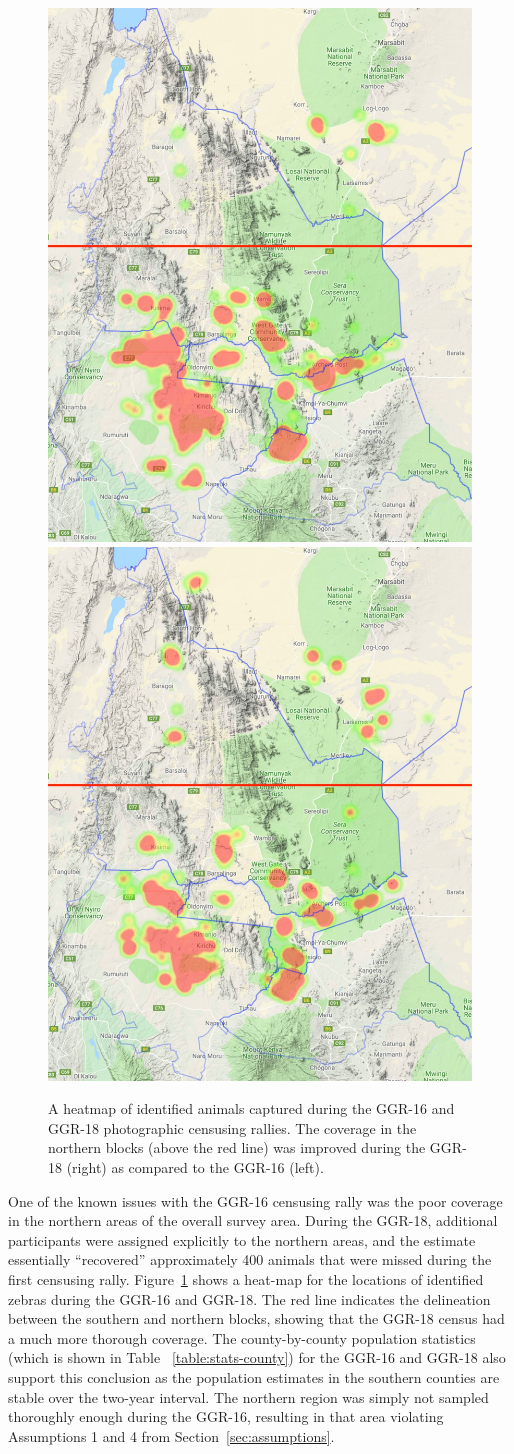 \begin{figure}[!t]
    \begin{center}
        \includegraphics[width=0.45\linewidth]{resources/coverage-ggr2016-sightings-zebra.pdf}
        \includegraphics[width=0.45\linewidth]{resources/coverage-ggr2018-sightings-zebra.pdf}
    \end{center}
    \caption{A heatmap of identified animals captured during the GGR-16 and GGR-18 photographic censusing rallies.  The coverage in the northern blocks (above the red line) was improved during the GGR-18 (right) as compared to the GGR-16 (left).}
    \label{fig:maps-coverage}
\end{figure}

One of the known issues with the GGR-16 censusing rally was the poor coverage in the northern areas of the overall survey area.  During the GGR-18, additional participants were assigned explicitly to the northern areas, and the estimate essentially ``recovered'' approximately 400 animals that were missed during the first censusing rally.  Figure~\ref{fig:maps-coverage} shows a heat-map for the locations of identified zebras during the GGR-16 and GGR-18.  The red line indicates the delineation between the southern and northern blocks, showing that the GGR-18 census had a much more thorough coverage.  The county-by-county population statistics (which is shown in Table ~\ref{table:stats-county}) for the GGR-16 and GGR-18 also support this conclusion as the population estimates in the southern counties are stable over the two-year interval.  The northern region was simply not sampled thoroughly enough during the GGR-16, resulting in that area violating Assumptions 1 and 4 from Section~\ref{sec:assumptions}.

